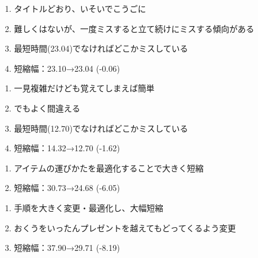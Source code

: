 \begin{enumerate}[label={\sarrow}]
\item タイトルどおり、いそいでこうごに
\item 難しくはないが、一度ミスすると立て続けにミスする傾向がある
\item 最短時間(23.04)でなければどこかミスしている
\item 短縮幅：23.10→23.04 (-0.06)
\end{enumerate}



\begin{enumerate}[label={\sarrow}]
\item 一見複雑だけども覚えてしまえば簡単
\item でもよく間違える
\item 最短時間(12.70)でなければどこかミスしている
\item 短縮幅：14.32→12.70 (-1.62)
\end{enumerate}



\begin{enumerate}[label={\sarrow}]
\item アイテムの運びかたを最適化することで大きく短縮
\item 短縮幅：30.73→24.68 (-6.05)
\end{enumerate}



\clearpage
\begin{enumerate}[label={\sarrow}]
\item 手順を大きく変更・最適化し、大幅短縮
\item おくうをいったんプレゼントを越えてもどってくるよう変更
\item 短縮幅：37.90→29.71 (-8.19)
\end{enumerate}



